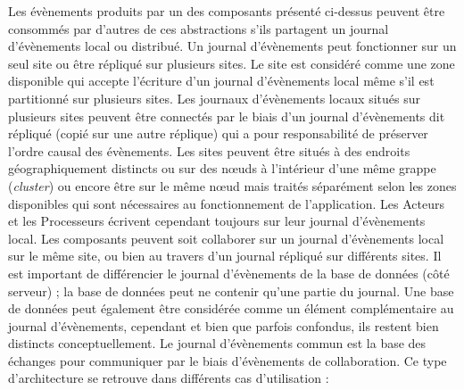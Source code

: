 Les évènements produits par un des composants présenté ci-dessus
peuvent être consommés par d'autres de ces abstractions s'ils partagent un 
journal d'évènements local ou distribué. Un journal d'évènements peut 
fonctionner sur un seul site ou être répliqué 
sur plusieurs sites. 
Le site est considéré comme une zone disponible qui accepte 
l'écriture d'un journal d'évènements local même s'il est partitionné sur plusieurs 
sites. Les journaux d'évènements locaux situés sur plusieurs sites peuvent être 
connectés par le biais d'un journal d'évènements dit \og répliqué\fg{} (copié sur une 
autre réplique) qui a pour responsabilité de préserver l'ordre causal des 
évènements.
Les sites peuvent être situés à des endroits géographiquement distincts ou sur 
des nœuds à l'intérieur d'une même grappe (\textit{cluster}) ou encore être sur le 
même nœud mais traités séparément selon les zones 
disponibles qui sont nécessaires au fonctionnement de l'application. 
Les Acteurs et les Processeurs écrivent cependant toujours sur leur journal 
d'évènements local. 
Les composants peuvent soit collaborer sur un journal d'évènements local sur le 
même site, ou bien au travers d'un journal répliqué sur différents sites.
Il est important de différencier le journal d'évènements de la base de données 
(côté serveur) ; la base de données peut ne contenir qu'une partie du journal. 
Une base de données peut également être considérée comme un élément 
complémentaire au journal d'évènements, cependant et bien que parfois 
confondus, ils restent bien distincts conceptuellement.
Le journal d'évènements commun est la base des échanges pour communiquer 
par le biais d'évènements de collaboration. Ce type d'architecture se retrouve dans 
différents cas d'utilisation :
